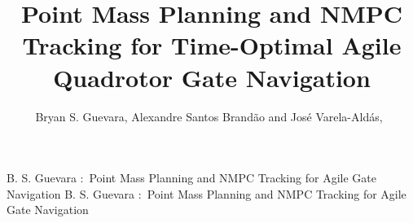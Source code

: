 \documentclass{ieeeaccess}
\begin{document}

\title{Point Mass Planning and NMPC Tracking for
       Time-Optimal Agile Quadrotor Gate Navigation}

\author{{Bryan S. Guevara}, {Alexandre Santos Brandão}
and José Varela-Aldás,~}

\address[1]{Centro de Investigación MIST, Facultad de Ingenierías,
Universidad Tecnológica Indoamérica, \mbox{Ambato 180103}, Ecuador
(e-mail: bguevara@indoamerica.edu.ec)}

\address[2]{Núcleo de Especialização em Robótica, Programa de Pós-Graduação em Ciência da Computação, Departamento de Engenharia Elétrica, Universidade Federal de Viçosa, Viçosa 36570-900, MG, Brazil (e-mail: alexandre.brandao@ufv.br)}


\markboth
{B. S. Guevara \headeretal:~Point Mass Planning and NMPC Tracking for Agile Gate Navigation}
{B. S. Guevara \headeretal:~Point Mass Planning and NMPC Tracking for Agile Gate Navigation}

\end{document}
